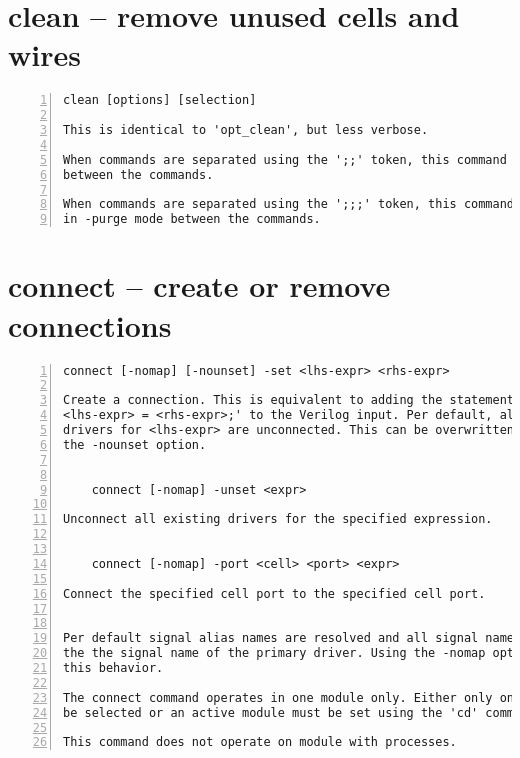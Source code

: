 \section{clean -- remove unused cells and wires}
\label{cmd:clean}
\begin{lstlisting}[numbers=left,frame=single]
    clean [options] [selection]

This is identical to 'opt_clean', but less verbose.

When commands are separated using the ';;' token, this command will be executed
between the commands.

When commands are separated using the ';;;' token, this command will be executed
in -purge mode between the commands.
\end{lstlisting}

\section{connect -- create or remove connections}
\label{cmd:connect}
\begin{lstlisting}[numbers=left,frame=single]
    connect [-nomap] [-nounset] -set <lhs-expr> <rhs-expr>

Create a connection. This is equivalent to adding the statement 'assign
<lhs-expr> = <rhs-expr>;' to the Verilog input. Per default, all existing
drivers for <lhs-expr> are unconnected. This can be overwritten by using
the -nounset option.


    connect [-nomap] -unset <expr>

Unconnect all existing drivers for the specified expression.


    connect [-nomap] -port <cell> <port> <expr>

Connect the specified cell port to the specified cell port.


Per default signal alias names are resolved and all signal names are mapped
the the signal name of the primary driver. Using the -nomap option deactivates
this behavior.

The connect command operates in one module only. Either only one module must
be selected or an active module must be set using the 'cd' command.

This command does not operate on module with processes.
\end{lstlisting}

